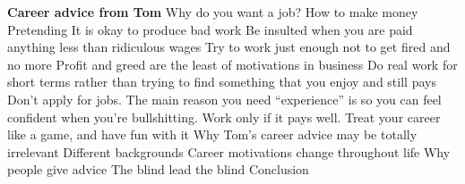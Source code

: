 \documentclass{beamer}
\begin{document}
\Huge\centering
\textbf{Career advice from Tom}
\newpage
Why do you want a job?
\newpage
How to make money
\newpage
Pretending
\newpage
It is okay to produce bad work
\newpage
Be insulted when you are paid anything less than ridiculous wages
\newpage
Try to work just enough not to get fired and no more
\newpage
Profit and greed are the least of motivations in business
\newpage
Do real work for short terms rather than trying to find something that you enjoy and still pays
\newpage
Don’t apply for jobs.
\newpage
The main reason you need “experience” is so you can feel confident when you’re bullshitting.
\newpage
Work only if it pays well.
\newpage
Treat your career like a game, and have fun with it
\newpage
Why Tom’s career advice may be totally irrelevant
\newpage
Different backgrounds
\newpage
Career motivations change throughout life
\newpage
Why people give advice
\newpage
The blind lead the blind
\newpage
Conclusion
\end{document}
